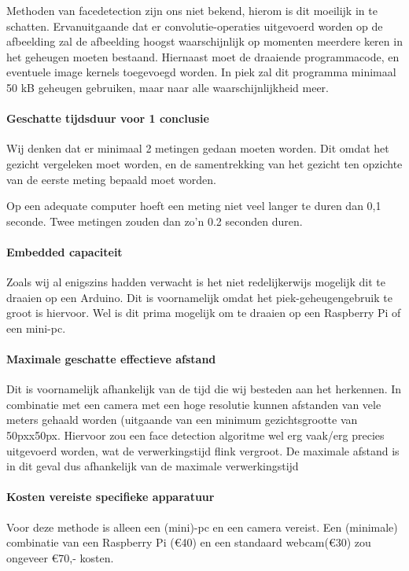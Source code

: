 \documentclass[11pt]{article}
\begin{document}
    Methoden van facedetection zijn ons niet bekend, hierom is dit moeilijk in te schatten.
    Ervanuitgaande dat er convolutie-operaties uitgevoerd worden op de afbeelding zal de afbeelding hoogst waarschijnlijk op momenten meerdere keren in het geheugen moeten bestaand.
    Hiernaast moet de draaiende programmacode, en eventuele image kernels toegevoegd worden.
    In piek zal dit programma minimaal 50 kB geheugen gebruiken, maar naar alle waarschijnlijkheid meer.

    \paragraph{Geschatte tijdsduur voor 1 conclusie}
    Wij denken dat er minimaal 2 metingen gedaan moeten worden.
    Dit omdat het gezicht vergeleken moet worden, en de samentrekking van het gezicht ten opzichte van de eerste meting bepaald moet worden.

    Op een adequate computer hoeft een meting niet veel langer te duren dan 0,1 seconde.
    Twee metingen zouden dan zo'n 0.2 seconden duren.

    \paragraph{Embedded capaciteit}
    Zoals wij al enigszins hadden verwacht is het niet redelijkerwijs mogelijk dit te draaien op een Arduino.
    Dit is voornamelijk omdat het piek-geheugengebruik te groot is hiervoor.
    Wel is dit prima mogelijk om te draaien op een Raspberry Pi of een mini-pc.

    \paragraph{Maximale geschatte effectieve afstand}
    Dit is voornamelijk afhankelijk van de tijd die wij besteden aan het herkennen.
    In combinatie met een camera met een hoge resolutie kunnen afstanden van vele meters gehaald worden (uitgaande van een minimum gezichtsgrootte van 50pxx50px.
    Hiervoor zou een face detection algoritme wel erg vaak/erg precies uitgevoerd worden, wat de verwerkingstijd flink vergroot.
    De maximale afstand is in dit geval dus afhankelijk van de maximale verwerkingstijd

    \paragraph{Kosten vereiste specifieke apparatuur}
    Voor deze methode is alleen een (mini)-pc en een camera vereist.
    Een (minimale) combinatie van een Raspberry Pi (\euro{}40) en een standaard webcam(\euro{}30) zou ongeveer \euro{}70,- kosten.
\end{document}
